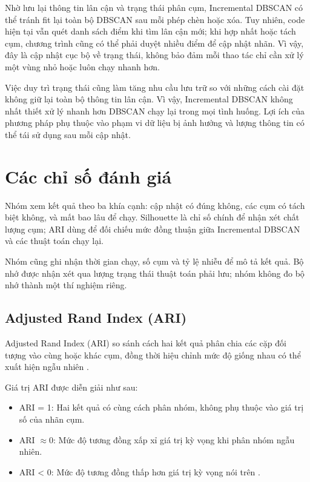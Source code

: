 Nhờ lưu lại thông tin lân cận và trạng thái phân cụm, Incremental DBSCAN có thể tránh fit lại toàn bộ DBSCAN sau mỗi phép chèn hoặc xóa. Tuy nhiên, code hiện tại vẫn quét danh sách điểm khi tìm lân cận mới; khi hợp nhất hoặc tách cụm, chương trình cũng có thể phải duyệt nhiều điểm để cập nhật nhãn. Vì vậy, đây là cập nhật cục bộ về trạng thái, không bảo đảm mỗi thao tác chỉ cần xử lý một vùng nhỏ hoặc luôn chạy nhanh hơn.

Việc duy trì trạng thái cũng làm tăng nhu cầu lưu trữ so với những cách cài đặt không giữ lại toàn bộ thông tin lân cận. Vì vậy, Incremental DBSCAN không nhất thiết xử lý nhanh hơn DBSCAN chạy lại trong mọi tình huống. Lợi ích của phương pháp phụ thuộc vào phạm vi dữ liệu bị ảnh hưởng và lượng thông tin có thể tái sử dụng sau mỗi cập nhật.

\section{Các chỉ số đánh giá}

Nhóm xem kết quả theo ba khía cạnh: cập nhật có đúng không, các cụm có tách biệt không, và mất bao lâu để chạy. Silhouette là chỉ số chính để nhận xét chất lượng cụm; ARI dùng để đối chiếu mức đồng thuận giữa Incremental DBSCAN và các thuật toán chạy lại.

Nhóm cũng ghi nhận thời gian chạy, số cụm và tỷ lệ nhiễu để mô tả kết quả. Bộ nhớ được nhận xét qua lượng trạng thái thuật toán phải lưu; nhóm không đo bộ nhớ thành một thí nghiệm riêng.

\subsection{Adjusted Rand Index (ARI)}

Adjusted Rand Index (ARI) so sánh cách hai kết quả phân chia các cặp đối tượng vào cùng hoặc khác cụm, đồng thời hiệu chỉnh mức độ giống nhau có thể xuất hiện ngẫu nhiên \parencite{hubertArabie1985}.

Giá trị ARI được diễn giải như sau:

\begin{itemize}
    \item ARI = 1: Hai kết quả có cùng cách phân nhóm, không phụ thuộc vào giá trị số của nhãn cụm.
    \item ARI \(\approx 0\): Mức độ tương đồng xấp xỉ giá trị kỳ vọng khi phân nhóm ngẫu nhiên.
    \item ARI < 0: Mức độ tương đồng thấp hơn giá trị kỳ vọng nói trên \parencite{hubertArabie1985}.
\end{itemize}

